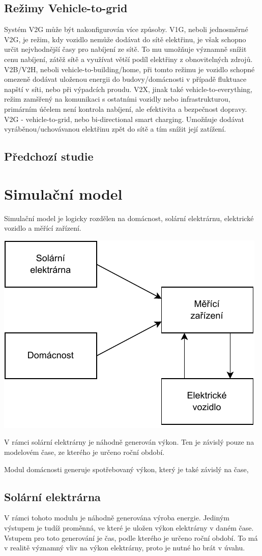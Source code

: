 \documentclass[12pt,a4paper]{article}
\begin{document}
\subsection{Režimy Vehicle-to-grid}
Systém V2G může být nakonfigurován více způsoby.
V1G, neboli jednosměrné V2G, je režim, kdy vozidlo nemůže dodávat do sítě elektřinu,
je však schopno určit nejvhodnější časy pro nabíjení ze sítě. To mu umožňuje významně snížit cenu nabíjení, zátěž sítě a využívat větší podíl elektřiny z obnovitelných zdrojů.
V2B/V2H, neboli vehicle-to-building/home, při tomto režimu je vozidlo schopné omezeně dodávat uloženou energii do budovy/domácnosti v případě fluktuace napští v síti, nebo při výpadcích proudu.
V2X, jinak také vehicle-to-everything, režim zamšřený na komunikaci s ostatními vozidly nebo infrastrukturou, primárním účelem není kontrola nabíjení, ale efektivita a bezpečnost dopravy.
V2G - vehicle-to-grid, nebo bi-directional smart charging. Umožňuje dodávat vyráběnou/uchovávanou elektřinu zpět do sítě a tím snížit její zatížení.

\subsection{Předchozí studie}

\section{Simulační model}
Simulační model je logicky rozdělen na domácnost, solární elektrárnu, elektrické vozidlo a měřící zařízení.

\bigskip
\includegraphics[width=0.5\linewidth]{img/diagram.pdf}
\bigskip

V rámci solární elektrárny je náhodně generován výkon.
Ten je závislý pouze na modelovém čase, ze kterého je určeno roční období.

Modul domácnosti generuje spotřebovaný výkon, který je také závislý na čase,


\subsection{Solární elektrárna}
V rámci tohoto modulu je náhodně generována výroba energie.
Jediným výstupem je tudíž proměnná, ve které je uložen výkon elektrárny v daném čase.
Vstupem pro toto generování je čas, podle kterého je určeno roční období.
To má v realitě významný vliv na výkon elektrárny, proto je nutné ho brát v úvahu.
\end{document}
